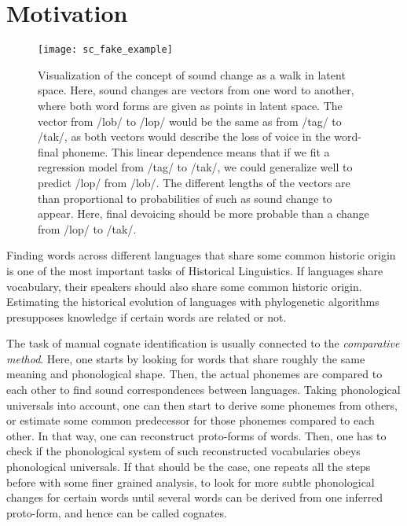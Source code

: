 \documentclass[6pt]{article}
\begin{document}
\section{Motivation}
\label{Motivation}
\begin{figure}[h]
\begin{center}
\texttt{[image: sc\_fake\_example]} 
\caption{Visualization of the concept of sound change as a walk in latent space. Here, sound changes are vectors from one word to another, where both word forms are given as points in latent space. The vector from /lob/ to /lop/ would be the same as from /tag/ to /tak/, as both vectors would describe the loss of voice in the word-final phoneme. This linear dependence means that if we fit a regression model from /tag/ to /tak/, we could generalize well to predict /lop/ from /lob/. The different lengths of the vectors are than proportional to probabilities of such as sound change to appear. Here, final devoicing should be more probable than a change from /lop/ to /tak/. }
\label{fig:final_devoicing}
\end{center}
\end{figure}

Finding words across different languages that share some common historic origin is one of the most important tasks of Historical Linguistics. If languages share vocabulary, their speakers should also share some common historic origin. Estimating the historical evolution of languages with phylogenetic algorithms presupposes knowledge if certain words are related or not. 


The task of manual cognate identification is usually connected to the \textit{comparative method}. Here, one starts by looking for words that share roughly the same meaning and phonological shape. Then, the actual phonemes are compared to each other to find sound correspondences between languages. Taking phonological universals into account, one can then start to derive some phonemes from others, or estimate some common predecessor for those phonemes compared to each other. In that way, one can reconstruct proto-forms of words. Then, one has to check if the phonological system of such reconstructed vocabularies obeys phonological universals. If that should be the case, one repeats all the steps before with some finer grained analysis, to look for more subtle phonological changes
 for certain words until several words can be derived from one inferred proto-form, and hence can be called cognates\citep[p. 191]{trask1996historical}.  
 
\end{document}
